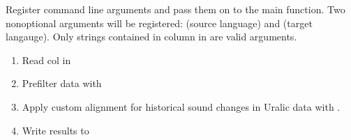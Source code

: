 \documentclass[letterpaper,10pt,english]{sphinxmanual}
\begin{document}
\begin{fulllineitems}
\label{\detokenize{mkedictor:ronataswestoldturkiccommands.maketoedict_rc.register}}
\pysigstartsignatures
{}
\pysigstopsignatures
\sphinxAtStartPar
Register command line arguments and pass them on to the main function.
Two non\sphinxhyphen{}optional arguments will be registered:
 (source language) and  (target langauge).
Only strings contained in column  in  are valid
arguments.

\end{fulllineitems}


\begin{fulllineitems}
\label{\detokenize{mkedictor:ronataswestoldturkiccommands.maketoedict_rc.run}}
\pysigstartsignatures
{}
\pysigstopsignatures\begin{enumerate}
%
\item {} 
\sphinxAtStartPar
Read col  in 

\item {} 
\sphinxAtStartPar
Prefilter data with 

\item {} 
\sphinxAtStartPar
Apply custom alignment for historical sound changes in Uralic data
with .

\item {} 
\sphinxAtStartPar
Write results to 

\end{enumerate}

\end{fulllineitems}
\end{document}
